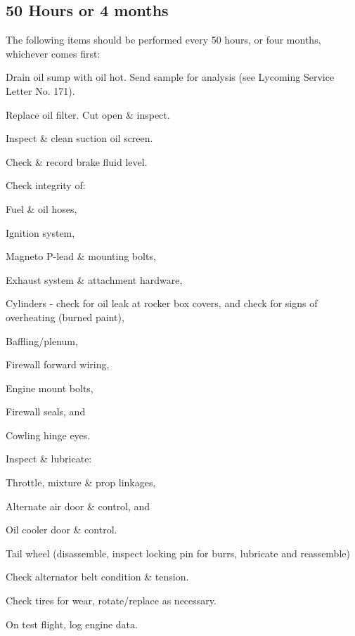 \subsection{50 Hours or 4 months} The following items should be performed every 50 hours, or four months, whichever comes first:
\begin{enumerate*}
	\item Drain oil sump with oil hot. Send sample for analysis (see Lycoming Service Letter No. 171). 
	\item Replace oil filter. Cut open \& inspect. 
	\item Inspect \& clean suction oil screen. 
	\item Check \& record brake fluid level. 
	\item Check integrity of: 
	\begin{enumerate*}
		\item Fuel \& oil hoses, 
		\item Ignition system, 
		\item Magneto P-lead \& mounting bolts, 
		\item Exhaust system \& attachment hardware, 
		\item Cylinders - check for oil leak at rocker box covers, and check for signs of overheating (burned paint), 
		\item Baffling/plenum, 
		\item Firewall forward wiring, 
		\item Engine mount bolts, 
		\item Firewall seals, and 
		\item Cowling hinge eyes. 
	\end{enumerate*}
	\item Inspect \& lubricate: 
	\begin{enumerate*}
		\item Throttle, mixture \& prop linkages, 
		\item Alternate air door \& control, and 
		\item Oil cooler door \& control. 
		\item Tail wheel (disassemble, inspect locking pin for burrs, lubricate and reassemble) 
	\end{enumerate*}
	\item Check alternator belt condition \& tension. 
	\item Check tires for wear, rotate/replace as necessary. 
	\item On test flight, log engine data. 
\end{enumerate*}

